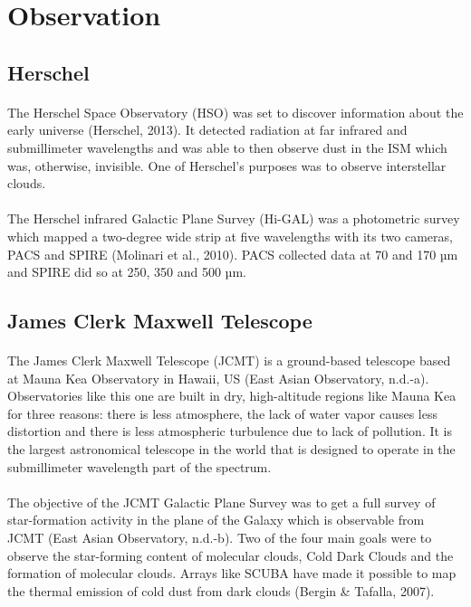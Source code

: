 \documentclass{article}
\begin{document}
\section{Observation}
\subsection{Herschel}
\paragraph{}

The Herschel Space Observatory (HSO) was set to discover information about the early universe (Herschel, 2013). It detected radiation at far infrared and submillimeter wavelengths and was able to then observe dust in the ISM which was, otherwise, invisible. One of Herschel’s purposes was to observe interstellar clouds.
\paragraph{}
The Herschel infrared Galactic Plane Survey (Hi-GAL) was a photometric survey which mapped a two-degree wide strip at five wavelengths with its two cameras, PACS and SPIRE (Molinari et al., 2010). PACS collected data at 70 and 170 µm and SPIRE did so at 250, 350 and 500 µm. 

\subsection{James Clerk Maxwell Telescope}
\paragraph{}

The James Clerk Maxwell Telescope (JCMT) is a ground-based telescope based at Mauna Kea Observatory in Hawaii, US (East Asian Observatory, n.d.-a). Observatories like this one are built in dry, high-altitude regions like Mauna Kea for three reasons: there is less atmosphere, the lack of water vapor causes less distortion and there is less atmospheric turbulence due to lack of pollution. It is the largest astronomical telescope in the world that is designed to operate in the submillimeter wavelength part of the spectrum. 
\paragraph{}
The objective of the JCMT Galactic Plane Survey was to get a full survey of star-formation activity in the plane of the Galaxy which is observable from JCMT (East Asian Observatory, n.d.-b). Two of the four main goals were to observe the star-forming content of molecular clouds, Cold Dark Clouds and the formation of molecular clouds. Arrays like SCUBA have made it possible to map the thermal emission of cold dust from dark clouds (Bergin \& Tafalla, 2007).
\end{document}
